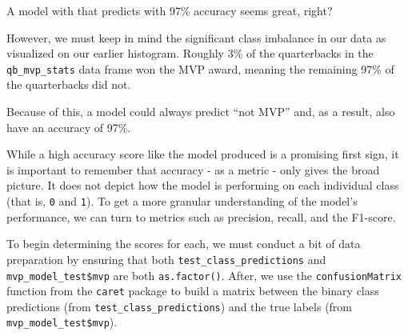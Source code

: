 \documentclass[
  letterpaper,
]{krantz}
\newenvironment{Shaded}{\begin{snugshade}}{\end{snugshade}}
\newcommand{\FunctionTok}[1]{\textcolor[rgb]{0.28,0.35,0.67}{#1}}
\newcommand{\NormalTok}[1]{\textcolor[rgb]{0.00,0.23,0.31}{#1}}
\newcommand{\OtherTok}[1]{\textcolor[rgb]{0.00,0.23,0.31}{#1}}
\newcommand{\SpecialCharTok}[1]{\textcolor[rgb]{0.37,0.37,0.37}{#1}}
\begin{document}
\begin{tcolorbox}[enhanced jigsaw, colback=white, leftrule=.75mm, breakable, colframe=quarto-callout-important-color-frame, bottomtitle=1mm, rightrule=.15mm, left=2mm, opacityback=0, bottomrule=.15mm, arc=.35mm, coltitle=black, colbacktitle=quarto-callout-important-color!10!white, toptitle=1mm, titlerule=0mm, title=\textcolor{quarto-callout-important-color}{\faExclamation}\hspace{0.5em}{Important}, toprule=.15mm, opacitybacktitle=0.6]

A model with that predicts with 97\% accuracy seems great, right?

However, we must keep in mind the significant class imbalance in our
data as visualized on our earlier histogram. Roughly 3\% of the
quarterbacks in the \texttt{qb\_mvp\_stats} data frame won the MVP
award, meaning the remaining 97\% of the quarterbacks did not.

Because of this, a model could always predict ``not MVP'' and, as a
result, also have an accuracy of 97\%.

While a high accuracy score like the model produced is a promising first
sign, it is important to remember that accuracy - as a metric - only
gives the broad picture. It does not depict how the model is performing
on each individual class (that is, \texttt{0} and \texttt{1}). To get a
more granular understanding of the model's performance, we can turn to
metrics such as precision, recall, and the F1-score.

To begin determining the scores for each, we must conduct a bit of data
preparation by ensuring that both \texttt{test\_class\_predictions} and
\texttt{mvp\_model\_test\$mvp} are both \texttt{as.factor()}. After, we
use the \texttt{confusionMatrix} function from the \texttt{caret}
package to build a matrix between the binary class predictions (from
\texttt{test\_class\_predictions}) and the true labels (from
\texttt{mvp\_model\_test\$mvp}).

\begin{Shaded}
\end{Shaded}


\end{tcolorbox}
\end{document}

